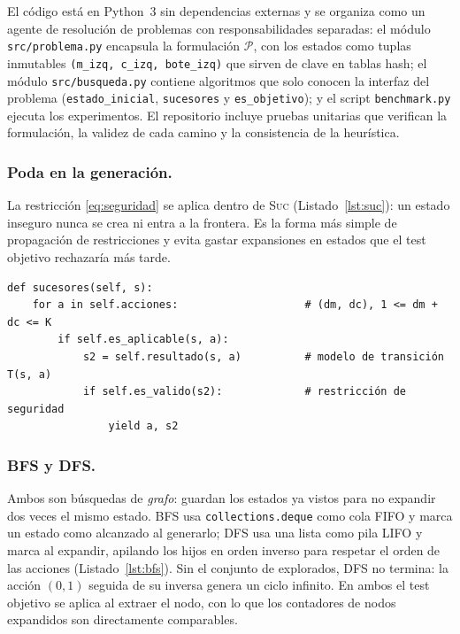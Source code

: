 \documentclass[runningheads]{llncs}
\begin{document}
El código está en Python~3 sin dependencias externas y se organiza como un agente
de resolución de problemas con responsabilidades separadas:
el módulo \texttt{src/problema.py} encapsula la formulación $\mathcal P$, con
los estados como tuplas inmutables \texttt{(m\_izq,~c\_izq,~bote\_izq)} que sirven
de clave en tablas hash; el módulo \texttt{src/busqueda.py} contiene algoritmos
que solo conocen la interfaz del problema (\texttt{estado\_inicial},
\texttt{sucesores} y \texttt{es\_objetivo}); y el script \texttt{benchmark.py}
ejecuta los experimentos. El repositorio incluye pruebas
unitarias que verifican la formulación, la validez de cada camino y la
consistencia de la heurística.

\subsubsection{Poda en la generación.}
La restricción \eqref{eq:seguridad} se aplica dentro de \textsc{Suc}
(Listado~\ref{lst:suc}): un estado inseguro nunca se crea ni entra a la frontera.
Es la forma más simple de propagación de restricciones y evita gastar
expansiones en estados que el test objetivo rechazaría más tarde.

\begin{lstlisting}[caption={Función de sucesores con poda de estados inseguros.},label={lst:suc}]
def sucesores(self, s):
    for a in self.acciones:                    # (dm, dc), 1 <= dm + dc <= K
        if self.es_aplicable(s, a):
            s2 = self.resultado(s, a)          # modelo de transición T(s, a)
            if self.es_valido(s2):             # restricción de seguridad
                yield a, s2
\end{lstlisting}

\subsubsection{BFS y DFS.}
Ambos son búsquedas de \emph{grafo}: guardan los estados ya vistos para no
expandir dos veces el mismo estado. BFS usa \texttt{collections.deque} como cola
FIFO y marca un estado como alcanzado al generarlo; DFS usa una lista como pila
LIFO y marca al expandir, apilando los hijos en orden inverso para respetar el
orden de las acciones (Listado~\ref{lst:bfs}). Sin el conjunto de explorados,
DFS no termina: la acción $(0,1)$ seguida de su inversa genera un ciclo
infinito. En ambos el test objetivo se aplica al extraer el nodo, con lo que
los contadores de nodos expandidos son directamente comparables.
\end{document}
